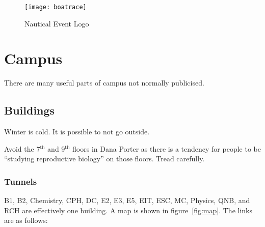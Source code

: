 \documentclass{book}
\begin{document}
\begin{figure}
\begin{center}
\texttt{[image: boatrace]}
\end{center}
\caption{\label{fig:boatrace}Nautical Event Logo}
\end{figure}

\chapter{Campus}
There are many useful parts of campus not normally publicised.

\section{Buildings}
Winter is cold. It is possible to not go outside.

Avoid the 7$^{\mathrm{th}}$ and 9$^{\mathrm{th}}$ floors in Dana Porter as there is a tendency for people to be ``studying reproductive biology'' on those floors. Tread carefully.

\subsection{Tunnels}
B1, B2, Chemistry, CPH, DC, E2, E3, E5, EIT, ESC, MC, Physics, QNB, and RCH are effectively one building. A map is shown in figure~\ref{fig:map}. The links are as follows: 
\end{document}
